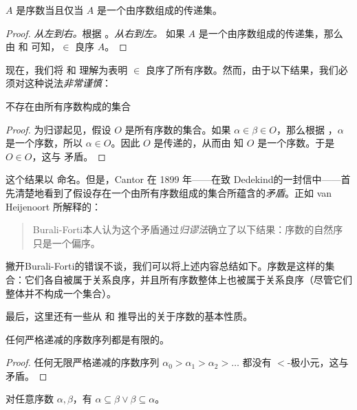 \documentclass[../../../include/open-logic-section]{subfiles}
\begin{document}
\begin{cor}
$A$ 是序数当且仅当 $A$ 是一个由序数组成的传递集。
\end{cor}

\begin{proof}
\emph{从左到右。}根据 。\emph{从右到左。}
如果 $A$ 是一个由序数组成的传递集，那么由  和  可知，$\in$ 良序 $A$。
\end{proof}

现在，我们将  和  理解为表明 $\in$ 良序了所有序数。然而，由于以下结果，我们必须对这种说法\emph{非常谨慎}：

\begin{thm}
不存在由所有序数构成的集合
\end{thm}

\begin{proof}
为归谬起见，假设 $O$ 是所有序数的集合。如果 $\alpha \in \beta \in O$，那么根据 ，$\alpha$ 是一个序数，所以 $\alpha \in O$。因此 $O$ 是传递的，从而由  知 $O$ 是一个序数。于是 $O \in O$，这与  矛盾。
\end{proof}
\noindent
这个结果以 \citeauthor{Burali-Forti1897} 命名。但是，Cantor 在 1899 年——在致 Dedekind的一封信中——首先清楚地看到了假设存在一个由所有序数组成的集合所蕴含的\emph{矛盾}。正如 van Heijenoort 所解释的：
\begin{quote}
  Burali-Forti本人认为这个矛盾通过\emph{归谬法}确立了以下结果：序数的自然序只是一个偏序。
  \citep[p.~105]{Heijenoort1967}
\end{quote}
撇开Burali-Forti的错误不谈，我们可以将上述内容总结如下。序数是这样的集合：它们各自被属于关系良序，并且所有序数整体上也被属于关系良序（尽管它们整体并不构成一个集合）。

最后，这里还有一些从  和  推导出的关于序数的基本性质。

\begin{prop}
任何严格递减的序数序列都是有限的。
\end{prop}

\begin{proof}
任何无限严格递减的序数序列 $\alpha_0 > \alpha_1 > \alpha_2 > \ldots$ 都没有 $<$-极小元，这与  矛盾。
\end{proof}

\begin{prop}
对任意序数 $\alpha, \beta$，有 $\alpha \subseteq \beta \lor \beta \subseteq \alpha$。
\end{prop}
\end{document}
